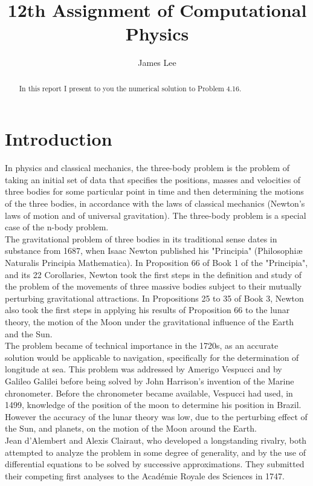 \documentclass[10pt,a4paper]{article}
\author{James Lee}
\title{12th Assignment of Computational Physics}
\begin{document}
	\maketitle
	\begin{abstract}
		In this report I present to you the numerical solution to Problem 4.16.
	\end{abstract}
	\section{Introduction}
	In physics and classical mechanics, the three-body problem is the problem of taking an initial set of data that specifies the positions, masses and velocities of three bodies for some particular point in time and then determining the motions of the three bodies, in accordance with the laws of classical mechanics (Newton's laws of motion and of universal gravitation). The three-body problem is a special case of the n-body problem.\\
	The gravitational problem of three bodies in its traditional sense dates in substance from 1687, when Isaac Newton published his "Principia" (Philosophiæ Naturalis Principia Mathematica). In Proposition 66 of Book 1 of the "Principia", and its 22 Corollaries, Newton took the first steps in the definition and study of the problem of the movements of three massive bodies subject to their mutually perturbing gravitational attractions. In Propositions 25 to 35 of Book 3, Newton also took the first steps in applying his results of Proposition 66 to the lunar theory, the motion of the Moon under the gravitational influence of the Earth and the Sun.\\
	The problem became of technical importance in the 1720s, as an accurate solution would be applicable to navigation, specifically for the determination of longitude at sea. This problem was addressed by Amerigo Vespucci and by Galileo Galilei before being solved by John Harrison's invention of the Marine chronometer. Before the chronometer became available, Vespucci had used, in 1499, knowledge of the position of the moon to determine his position in Brazil. However the accuracy of the lunar theory was low, due to the perturbing effect of the Sun, and planets, on the motion of the Moon around the Earth.\\
	Jean d'Alembert and Alexis Clairaut, who developed a longstanding rivalry, both attempted to analyze the problem in some degree of generality, and by the use of differential equations to be solved by successive approximations. They submitted their competing first analyses to the Académie Royale des Sciences in 1747.\\
\end{document}
